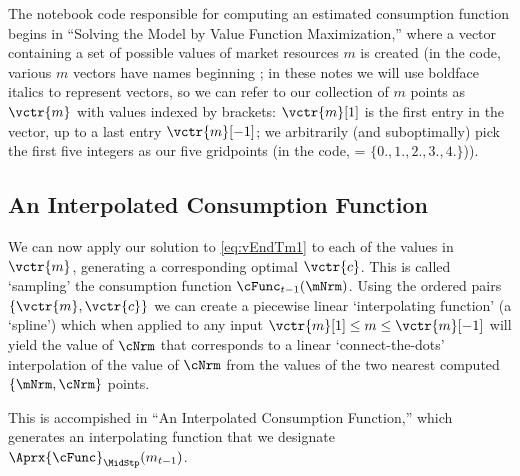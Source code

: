 The notebook code responsible for computing an estimated consumption function begins in ``Solving the Model by Value Function Maximization,'' where a vector containing a set of possible values of market resources ${m}$ is created (in the code, various $m$ vectors have names beginning {\mVec}; in these notes we will use boldface italics to represent vectors, so we can refer to our collection of ${m}$ points as $\vctr{m}$ with values indexed by brackets: $\vctr{m}[1]$ is the first entry in the vector, up to a last entry $\vctr{m}[-1]$; we arbitrarily (and suboptimally) pick the first five integers as our five {\mVec}  gridpoints (in the code, = $\{0.,1.,2.,3.,4.\}$)).



\hypertarget{an-interpolated-consumption-function}{}
\subsection{An Interpolated Consumption Function} \label{subsec:LinInterp}

We can now apply our solution to \eqref{eq:vEndTm1} to each of the values in $\vctr{m}$, generating a corresponding optimal $\vctr{c}$.  This is called `sampling' the consumption function $\cFunc_{\prdT-1}(\mNrm)$.  Using the ordered pairs $\{\vctr{m},\vctr{c}\}$ we can create a piecewise linear `interpolating function' (a `spline') which when applied to any input $\vctr{m}[1] \leq {m} \leq \vctr{m}[-1]$ will yield the value of $\cNrm$ that corresponds to a linear `connect-the-dots' interpolation of the value of $\cNrm$ from the values of the two nearest computed $\{\mNrm,\cNrm\}$ points.

This is accompished in ``An Interpolated Consumption Function,'' which generates an interpolating function that we designate $\Aprx{\cFunc}_{\MidStp}({m}_{\prdT-1})$. %

